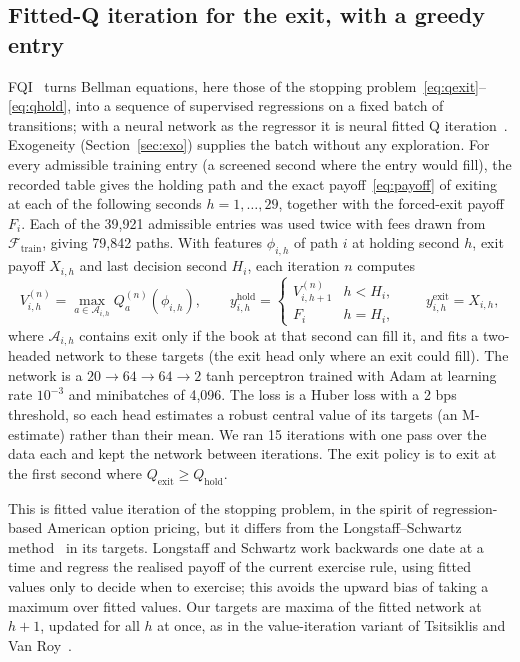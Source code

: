 \documentclass[12pt,a4paper]{article}
\DeclareRobustCommand{\bps}{\ifmmode\,\text{bps}\else\,bps\fi}
\begin{document}
\subsection{Fitted-Q iteration for the exit, with a greedy entry}\label{sec:fqi}
FQI~\cite{ernst} turns Bellman equations, here those of the stopping
problem~\eqref{eq:qexit}--\eqref{eq:qhold}, into a sequence of supervised regressions on a
fixed batch of transitions; with a neural network as the regressor it is neural fitted Q
iteration~\cite{nfq}. Exogeneity (Section~\ref{sec:exo}) supplies the batch without any
exploration. For every admissible training entry (a screened second where the entry would
fill), the recorded table gives the holding path and the exact payoff~\eqref{eq:payoff} of
exiting at each of the following seconds $h=1,\ldots,29$, together with the forced-exit payoff
$F_i$. Each of the 39,921 admissible entries was used twice with fees drawn from
$\mathcal{F}_{\text{train}}$, giving 79,842 paths. With features $\phi_{i,h}$ of path $i$ at
holding second $h$, exit payoff $X_{i,h}$ and last decision second $H_i$, each iteration $n$
computes
\begin{equation}
V^{(n)}_{i,h}=\max_{a\in\mathcal{A}_{i,h}}Q^{(n)}_{a}(\phi_{i,h}),
\qquad
y^{\text{hold}}_{i,h}=\begin{cases}V^{(n)}_{i,h+1} & h<H_i,\\ F_i & h=H_i,\end{cases}
\qquad y^{\text{exit}}_{i,h}=X_{i,h},
\label{eq:fqi}
\end{equation}
where $\mathcal{A}_{i,h}$ contains exit only if the book at that second can fill it, and fits
a two-headed network to these targets (the exit head only where an exit could fill). The
network is a $20\to64\to64\to2$ tanh perceptron trained with Adam at learning rate $10^{-3}$
and minibatches of 4,096. The loss is a Huber loss with a 2\bps{} threshold, so each head
estimates a robust central value of its targets (an M-estimate) rather than their mean. We
ran 15 iterations with one pass over the data each and kept the network between iterations.
The exit policy is to exit at the first second where $Q_{\text{exit}}\geq Q_{\text{hold}}$.

This is fitted value iteration of the stopping problem, in the spirit of regression-based
American option pricing, but it differs from the Longstaff--Schwartz method~\cite{lsm} in its
targets. Longstaff and Schwartz work backwards one date at a time and regress the realised
payoff of the current exercise rule, using fitted values only to decide when to exercise;
this avoids the upward bias of taking a maximum over fitted values. Our targets are maxima of
the fitted network at $h+1$, updated for all $h$ at once, as in the value-iteration variant of
Tsitsiklis and Van Roy~\cite{tvr}.
\end{document}
